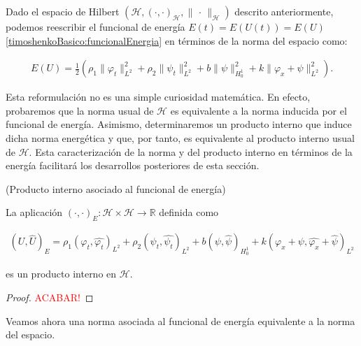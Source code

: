 Dado el espacio de Hilbert $(\mathcal{H}, (\cdot, \cdot)_{\mathcal{H}}, \lVert \, \cdot \, \rVert_{\mathcal{H}})$ descrito anteriormente, podemos reescribir el funcional de energía $E(t) = E(U(t)) = E(U)$ \eqref{timoshenkoBasico:funcionalEnergia} en términos de la norma del espacio como:

\begin{align}
    \label{timoshenkoBasico:funcionalEnergiaNorma}
    E(U) = \frac{1}{2}\left( \rho_1 \lVert \varphi_t \rVert^2_{L^2} + \rho_2 \lVert \psi_t \rVert_{L^2}^2 + b \lVert \psi \rVert_{H_0^1}^2 + k \lVert \varphi_x + \psi \rVert_{L^2}^2 \right).
\end{align}

Esta reformulación no es una simple curiosidad matemática. En efecto, 
probaremos que la norma usual de \(\mathcal{H}\) es equivalente a la 
norma inducida por el funcional de energía. Asimismo, determinaremos 
un producto interno que induce dicha norma energética y que, por tanto, 
es equivalente al producto interno usual de \(\mathcal{H}\). Esta 
caracterización de la norma y del producto interno en términos de la 
energía facilitará los desarrollos posteriores de esta sección.\\

\begin{Proposicion}{(Producto interno asociado al funcional de energía)}
    \label{ch:teoriaVigas:prop:ProdInternoEnergia}

    La aplicación $(\cdot, \cdot)_{E} : \mathcal{H} \times \mathcal{H} \rightarrow \mathbb{R}$ definida como

    \begin{align}
        \label{prodInternoEnergiaH}
        (U, \hat{U})_{E} = \rho_1 (\varphi_t, \hat{\varphi_t})_{L^2} + \rho_2 (\psi_t, \hat{\psi_t})_{L^2} + b (\psi, \hat{\psi})_{H_0^1} + k (\varphi_x + \psi, \hat{\varphi_x} + \hat{\psi})_{L^2}
    \end{align}

    es un producto interno en $\mathcal{H}$.
\end{Proposicion}

\begin{proof}
    \textcolor{red}{ACABAR!}
\end{proof}

Veamos ahora una norma asociada al funcional de energía equivalente a la norma del espacio.\\

